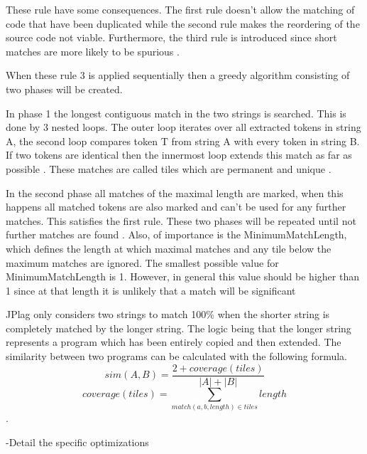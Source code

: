 \documentclass[a4paper, 11pt]{article}
\renewcommand{\\}{\vspace*{0.5\baselineskip} \newline}
\begin{document}
These rule have some consequences. The first rule doesn't allow the matching of code that have been duplicated while
the second rule makes the reordering of the source code not viable. Furthermore, the third rule is introduced since
short matches are more likely to be spurious \autocite[p. 11]{JPlagP}.

When these rule 3 is applied sequentially then a greedy algorithm consisting of two phases will be created.

In phase 1 the longest contiguous match in the two strings is searched. This is done by 3 nested loops. The outer loop iterates over all extracted
tokens in string A, the second loop compares token T from string A with every token in string B. If two tokens are identical then the innermost loop
extends this match as far as possible \autocite[p. 11]{JPlagP}. These matches are called tiles which are permanent and unique \autocite[p. 3]{GST}.

In the second phase all matches of the maximal length are marked, when this happens all matched tokens are also marked and can't be used for any
further matches. This satisfies the first rule. These two phases will be repeated until not further matches are found \autocite[p. 11]{JPlagP}.
Also, of importance is the MinimumMatchLength, which defines the length at which maximal matches and any tile below the maximum matches are ignored.
The smallest possible value for MinimumMatchLength is 1. However, in general this value should be higher than 1 since at that length it is unlikely
that a match will be significant \autocite[p. 3]{GST}

JPlag only considers two strings to match 100\% when the shorter string is completely matched by the longer string. The logic being that the longer string
represents a program which has been entirely copied and then extended. 
The similarity between two programs can be calculated with the following formula.
\[
	sim(A,B) = \frac{2+coverage(tiles)}{|A|+|B|}
\]
\[
	coverage(tiles) = \sum_{match(a,b,length)\in tiles} length
\]
\autocite[p. 13]{JPlagP}.

{\color{red} -Detail the specific optimizations}
\end{document}
